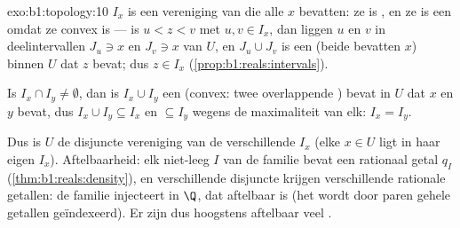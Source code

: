 \begin{solution}{exo:b1:topology:10}
$I_x$ is een vereniging van   die alle $x$ bevatten: ze is
, en ze is een  omdat ze convex is --- is $u < z < v$ met $u,
v \in I_x$, dan liggen $u$ en $v$ in  deelintervallen $J_u \ni x$ en
$J_v \ni x$ van $U$, en $J_u \cup J_v$ is een  (beide bevatten
$x$) binnen $U$ dat $z$ bevat; dus $z \in I_x$
(\cref{prop:b1:reals:intervals}).

Is $I_x \cap I_y \neq \emptyset$, dan is $I_x \cup I_y$ een  
(convex: twee overlappende ) bevat in $U$ dat $x$ en $y$
bevat, dus $I_x \cup I_y \subseteq I_x$ en $\subseteq I_y$ wegens de
maximaliteit van elk: $I_x = I_y$.

Dus is $U$ de disjuncte vereniging van de verschillende 
$I_x$ (elke $x \in U$ ligt in haar eigen $I_x$). Aftelbaarheid: elk
niet-leeg   $I$ van de familie bevat een rationaal getal
$q_I$ (\cref{thm:b1:reals:density}), en verschillende disjuncte
 krijgen verschillende rationale getallen: de familie
injecteert in $\Q$, dat aftelbaar is (het wordt door paren gehele
getallen geïndexeerd). Er zijn dus hoogstens aftelbaar veel .
\end{solution}

